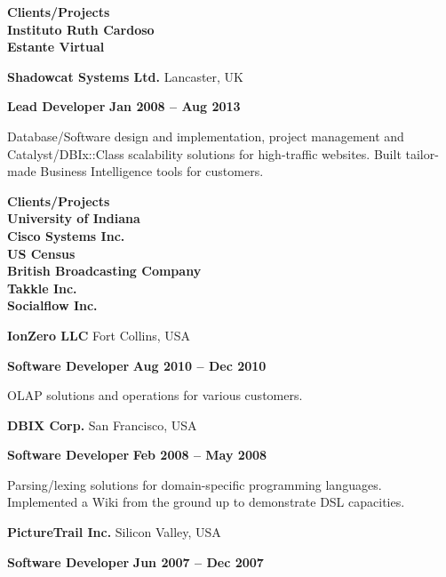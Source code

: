 \documentclass[a4paper,oneside]{memoir}
\begin{document}
\begin{multicols}{2}
\begin{flushleft}
\footnotesize\textbf{\color{RoyalBlue}Clients/Projects}\\
\textbf{Instituto Ruth Cardoso}\\
\textbf{Estante Virtual}\\

\normalsize

\textbf{\color{RoyalBlue}Shadowcat Systems Ltd.} \footnotesize Lancaster, UK\normalsize

\textbf{Lead Developer}
\footnotesize\textbf{Jan 2008 -- Aug 2013}\normalsize

\scriptsize

Database/Software design and implementation, project management and
Catalyst/DBIx::Class scalability solutions for high-traffic websites. Built
tailor-made Business Intelligence tools for customers.

\footnotesize\textbf{\color{RoyalBlue}Clients/Projects}\\
\textbf{University of Indiana}\\
\textbf{Cisco Systems Inc.}\\
\textbf{US Census}\\
\textbf{British Broadcasting Company}\\
\textbf{Takkle Inc.}\\
\textbf{Socialflow Inc.}\\

\normalsize

\textbf{\color{RoyalBlue}IonZero LLC} \footnotesize Fort Collins, USA\normalsize

\textbf{Software Developer}
\footnotesize\textbf{Aug 2010 -- Dec 2010}\normalsize

\scriptsize

OLAP solutions and operations for various customers.

\normalsize

\textbf{\color{RoyalBlue}DBIX Corp.} \footnotesize San Francisco, USA\normalsize

\textbf{Software Developer}
\footnotesize\textbf{Feb 2008 -- May 2008}\normalsize

\scriptsize

Parsing/lexing solutions for domain-specific programming languages. Implemented
a Wiki from the ground up to demonstrate DSL capacities.

\normalsize

\textbf{\color{RoyalBlue}PictureTrail Inc.} \footnotesize Silicon Valley, USA\normalsize

\textbf{Software Developer}
\footnotesize\textbf{Jun 2007 -- Dec 2007}\normalsize


\end{flushleft}
\end{multicols}
\end{document}
